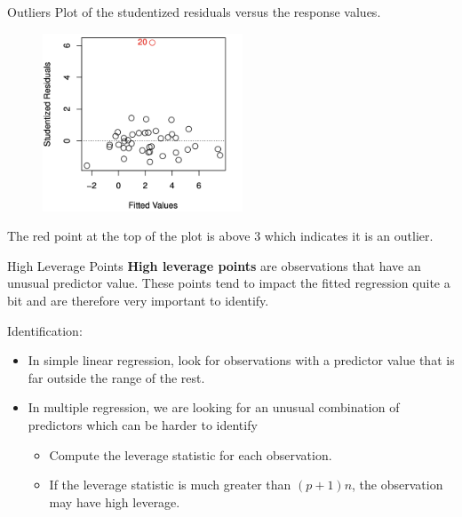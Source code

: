 \documentclass[
  ignorenonframetext,
  aspectratio=169,
]{beamer}
\begin{document}
\begin{frame}{Outliers}
\protect\hypertarget{outliers-1}{}
Plot of the studentized residuals versus the response values.

\begin{figure}

{\centering \includegraphics[width=2.34375in,height=\textheight]{images/studentized_re.png}

}

\end{figure}

The red point at the top of the plot is above 3 which indicates it is an
outlier.
\end{frame}

\begin{frame}{High Leverage Points}
\protect\hypertarget{high-leverage-points}{}
\textbf{High leverage points} are observations that have an unusual
predictor value. These points tend to impact the fitted regression quite
a bit and are therefore very important to identify.

Identification:

\begin{itemize}
\item
  In simple linear regression, look for observations with a predictor
  value that is far outside the range of the rest.
\item
  In multiple regression, we are looking for an unusual combination of
  predictors which can be harder to identify

  \begin{itemize}
  \item
    Compute the leverage statistic for each observation.
  \item
    If the leverage statistic is much greater than \((p+1)n\), the
    observation may have high leverage.
  \end{itemize}
\end{itemize}
\end{frame}
\end{document}

